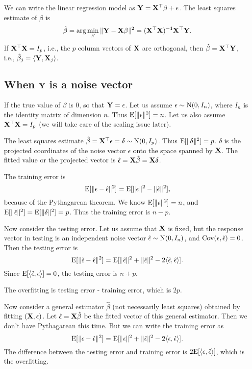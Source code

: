 \documentclass[11pt]{article}
\newcommand{\E}{\mathbb{E}}
\def\Cov{{\rm Cov}}
\def\T{{\top}}
\def\E{{\rm E}}
\def\T{{\top}}
\def\Cov{{\rm Cov}}
\def\X{{\bf X}}
\def\Y{{\bf Y}}
\def\bbeta{\boldmath{\beta}}
\begin{document}
We can write the linear regression model as $\Y = \X^{\T}\beta + \epsilon$. The least squares estimate of $\beta$ is 
\[
\hat{\beta} = \arg\min_{\beta} \|\Y - \X\bbeta\|^{2} = (\X^{\T}\X)^{-1}\X^{\T}\Y.
\]
If $\X^\T\X = I_p$, i.e., the $p$ column vectors of $\X$ are orthogonal, then $\hat{\beta} = \X^\T \Y$, i.e., $\hat{\beta}_j = \langle \Y, \X_j\rangle$. 

\subsection{When $\Y$ is a noise vector} 

If the true value of $\beta$ is 0, so that $\Y = \epsilon$. Let us assume $\epsilon \sim {\rm N}(0, I_n)$, where $I_n$ is the identity matrix of dimension $n$.  Thus $\E[\|\epsilon\|^2] = n$. Let us also assume $\X^\T \X  = I_p$ (we will take care of the scaling issue later). 

The least squares estimate $\hat{\beta} = \X^\T \epsilon = \delta \sim {\rm N}(0, I_p)$. Thus $\E[\|\delta\|^2] = p$. $\delta$ is the projected coordinates of the noise vector $\epsilon$ onto the space spanned by $\X$.  The fitted value or the projected vector is $\hat{\epsilon} = \X \hat{\beta}  = \X \delta$. 

The training error is 
\[
    \E[\|\epsilon - \hat{\epsilon}\|^2] = \E[\|\epsilon\|^2 - \|\hat{\epsilon}\|^2], 
\]
because of the Pythagarean theorem.  We know $\E[\|\epsilon\|^2] = n$, and $\E[\|\hat{\epsilon}\|^2] =  \E[\|\delta\|^2] = p$. Thus the training error is $n - p$. 
    
    
Now consider the testing error. Let us assume that $\X$ is fixed, but the response vector in testing is an independent noise vector $\tilde{\epsilon} \sim {\rm N}(0, I_n)$, and $\Cov(\epsilon, \tilde{\epsilon}) = 0$. Then the testing error is 
\[
    \E[\|\tilde{\epsilon} - \hat{\epsilon}\|^2] = \E[\|\tilde{\epsilon}\|^2 + \|\hat{\epsilon}\|^2 - 2 \langle \tilde{\epsilon}, \hat{\epsilon}\rangle]. 
\]
Since $\E[\langle \tilde{\epsilon}, \epsilon\rangle] = 0$, the testing error is $n + p$. 

The overfitting is testing error - training error, which is $2p$. 

Now consider a general estimator $\hat{\beta}$ (not necessarily least squares) obtained by fitting $(\X, \epsilon)$. Let $\hat{\epsilon} = \X\hat{\beta}$ be the fitted vector of this general estimator. Then we don't have Pythagarean this time. But we can write the training error as 
\[
    \E[\|\epsilon - \hat{\epsilon}\|^2] = \E[\|\epsilon\|^2 + \|\hat{\epsilon}\|^2 - 2\langle \epsilon, \hat{\epsilon} \rangle]. 
\]
The difference between the testing error and training error is $2 \E[\langle \epsilon, \hat{\epsilon}\rangle]$, which is the overfitting. 
\end{document}
